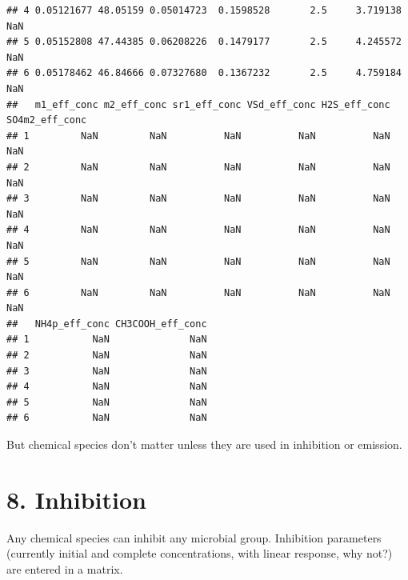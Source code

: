 \documentclass[
]{article}
\begin{document}
\begin{verbatim}
## 4 0.05121677 48.05159 0.05014723  0.1598528       2.5     3.719138         NaN
## 5 0.05152808 47.44385 0.06208226  0.1479177       2.5     4.245572         NaN
## 6 0.05178462 46.84666 0.07327680  0.1367232       2.5     4.759184         NaN
##   m1_eff_conc m2_eff_conc sr1_eff_conc VSd_eff_conc H2S_eff_conc SO4m2_eff_conc
## 1         NaN         NaN          NaN          NaN          NaN            NaN
## 2         NaN         NaN          NaN          NaN          NaN            NaN
## 3         NaN         NaN          NaN          NaN          NaN            NaN
## 4         NaN         NaN          NaN          NaN          NaN            NaN
## 5         NaN         NaN          NaN          NaN          NaN            NaN
## 6         NaN         NaN          NaN          NaN          NaN            NaN
##   NH4p_eff_conc CH3COOH_eff_conc
## 1           NaN              NaN
## 2           NaN              NaN
## 3           NaN              NaN
## 4           NaN              NaN
## 5           NaN              NaN
## 6           NaN              NaN
\end{verbatim}

But chemical species don't matter unless they are used in inhibition or
emission.

\hypertarget{inhibition}{%
\section{8. Inhibition}\label{inhibition}}

Any chemical species can inhibit any microbial group. Inhibition
parameters (currently initial and complete concentrations, with linear
response, why not?) are entered in a matrix.
\end{document}
